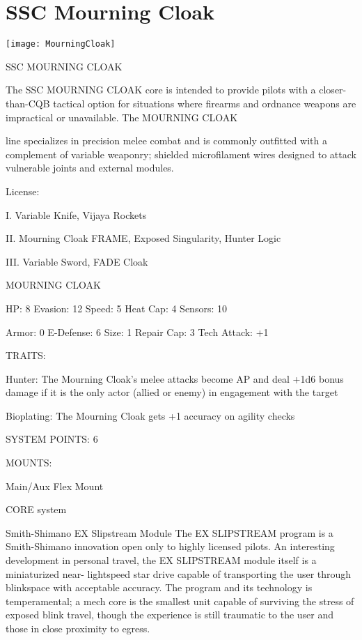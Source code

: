 \section{SSC Mourning Cloak}

\texttt{[image: MourningCloak]}


                                    SSC MOURNING CLOAK

The SSC MOURNING CLOAK core is intended to provide pilots with a closer-than-CQB tactical option for
situations where firearms and ordnance weapons are impractical or unavailable. The MOURNING CLOAK

line specializes in precision melee combat and is commonly outfitted with a complement of variable
weaponry; shielded microfilament wires designed to attack vulnerable joints and external modules.


                                                  License:

I. Variable Knife, Vijaya Rockets

II. Mourning Cloak FRAME, Exposed Singularity, Hunter Logic

III. Variable Sword, FADE Cloak


                                           MOURNING CLOAK

  HP: 8          Evasion: 12                          Speed: 5           Heat Cap: 4        Sensors: 10

  Armor: 0       E-Defense: 6                         Size: 1            Repair Cap: 3      Tech Attack:
                                                                                            +1

                                                   TRAITS:

  Hunter: The Mourning Cloak’s melee attacks become AP and deal +1d6 bonus damage if it is the only
  actor (allied or enemy) in engagement with the target

  Bioplating: The Mourning Cloak gets +1 accuracy on agility checks

                                             SYSTEM POINTS: 6

                                                  MOUNTS:

  Main/Aux                                             Flex Mount

                                                CORE system




                                     Smith-Shimano EX Slipstream Module
   The EX SLIPSTREAM program is a Smith-Shimano innovation open only to highly licensed pilots. An
  interesting development in personal travel, the EX SLIPSTREAM module itself is a miniaturized near-
  lightspeed star drive capable of transporting the user through blinkspace with acceptable accuracy. The
  program and its technology is temperamental; a mech core is the smallest unit capable of surviving the
  stress of exposed blink travel, though the experience is still traumatic to the user and those in close
  proximity to egress.

